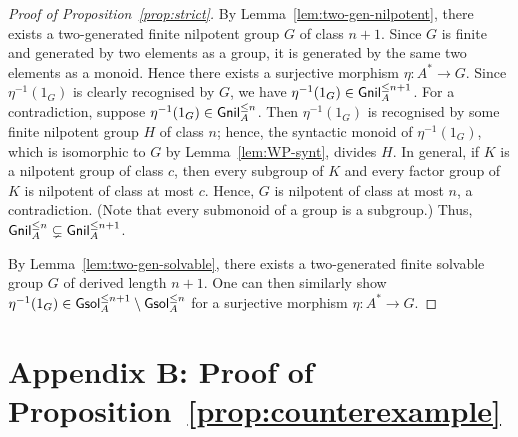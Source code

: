 \begin{proof}[Proof of Proposition~\ref{prop:strict}]
  By Lemma~\ref{lem:two-gen-nilpotent}, there exists a two-generated finite nilpotent group \(G\) of class \(n + 1\).
  Since \(G\) is finite and generated by two elements as a group, it is generated by the same two elements as a monoid.
  Hence there exists a surjective morphism \(\eta\colon A^* \to G\).
  Since \(\eta^{-1}(1_G)\) is clearly recognised by \(G\), we have \(\eta^{-1}(1_G) \in \mathsf{Gnil}_A^{\leq n + 1}\).
  For a contradiction, suppose \(\eta^{-1}(1_G) \in \mathsf{Gnil}_A^{\leq n}\).
  Then \(\eta^{-1}(1_G)\) is recognised by some finite nilpotent group \(H\) of class \(n\);
  hence, the syntactic monoid of \(\eta^{-1}(1_G)\), which is isomorphic to \(G\) by Lemma~\ref{lem:WP-synt}, divides \(H\).
  In general, if \(K\) is a nilpotent group of class \(c\),
  then every subgroup of \(K\) and every factor group of \(K\) is nilpotent of class at most \(c\).
  Hence, \(G\) is nilpotent of class at most \(n\), a contradiction.
  (Note that every submonoid of a group is a subgroup.)
  Thus, \(\mathsf{Gnil}_A^{\leq n} \subsetneq \mathsf{Gnil}_A^{\leq n + 1}\).

  By Lemma~\ref{lem:two-gen-solvable}, there exists a two-generated finite solvable group \(G\) of derived length \(n + 1\).
  One can then similarly show \(\eta^{-1}(1_G) \in \mathsf{Gsol}_A^{\leq n + 1} \setminus \mathsf{Gsol}_A^{\leq n}\) for a surjective morphism \(\eta\colon A^* \to G\).
\end{proof}

\section{Appendix B: Proof of Proposition~\ref{prop:counterexample}}

